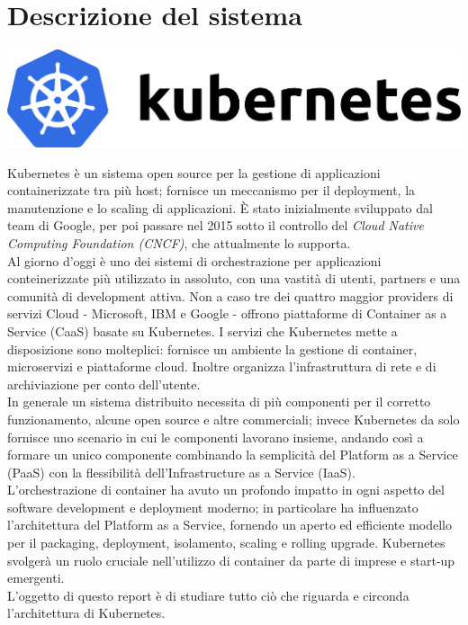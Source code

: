 \documentclass[12pt, a4paper]{report}
\begin{document}
\chapter{Descrizione del sistema}
\begin{center}
  \includegraphics[scale = 0.9]{Images/kubernetesLogo}
\end{center}
Kubernetes è un sistema open source per la gestione di applicazioni containerizzate tra più host; fornisce un meccanismo per il deployment, la manutenzione e lo scaling di applicazioni. È stato inizialmente sviluppato dal team di Google, per poi passare nel 2015 sotto il controllo del \textit{Cloud Native Computing Foundation (CNCF)}, che attualmente lo supporta.\\ Al giorno d'oggi è uno dei sistemi di orchestrazione per applicazioni conteinerizzate più utilizzato in assoluto, con una vastità di utenti, partners e una comunità di development attiva. Non a caso tre dei quattro maggior providers di servizi Cloud - Microsoft, IBM e Google - offrono piattaforme di Container as a Service (CaaS) basate su Kubernetes. I servizi che Kubernetes mette a disposizione sono molteplici: fornisce un ambiente la gestione di container, microservizi e piattaforme cloud. Inoltre organizza l'infrastruttura di rete e di archiviazione per conto dell'utente.\\
In generale un sistema distribuito necessita di più componenti per il corretto funzionamento, alcune open source e altre commerciali; invece Kubernetes da solo fornisce uno scenario in cui le componenti lavorano insieme, andando così a formare un unico componente combinando la semplicità del Platform as a Service (PaaS) con la flessibilità dell'Infrastructure as a Service (IaaS).\\
L'orchestrazione di container ha avuto un profondo impatto in ogni aspetto del software development e deployment moderno; in particolare ha influenzato l'architettura del Platform as a Service, fornendo un aperto ed efficiente modello per il packaging, deployment, isolamento, scaling e rolling upgrade. Kubernetes svolgerà un ruolo cruciale nell'utilizzo di container da parte di imprese e start-up emergenti.
\\L'oggetto di questo report è di studiare tutto ciò che riguarda e circonda l'architettura di Kubernetes.
\end{document}
